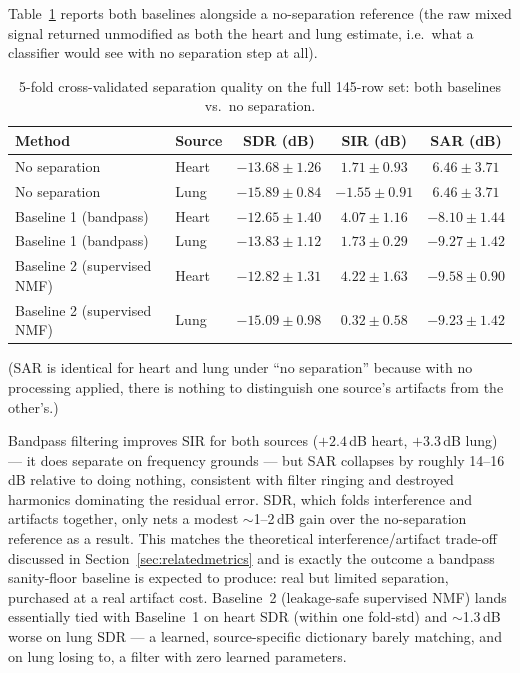 \documentclass[11pt]{article}
\begin{document}
Table~\ref{tab:baselinefull} reports both baselines alongside a
no-separation reference (the raw mixed signal returned unmodified as both
the heart and lung estimate, i.e.\ what a classifier would see with no
separation step at all).

\begin{table}[H]
\centering
\caption{5-fold cross-validated separation quality on the full 145-row set: both baselines vs.\ no separation.}
\label{tab:baselinefull}
\begin{tabular}{@{}llccc@{}}
\toprule
Method & Source & SDR (dB) & SIR (dB) & SAR (dB) \\
\midrule
No separation & Heart & $-13.68 \pm 1.26$ & $1.71 \pm 0.93$  & $6.46 \pm 3.71$ \\
No separation & Lung  & $-15.89 \pm 0.84$ & $-1.55 \pm 0.91$ & $6.46 \pm 3.71$ \\
\addlinespace
Baseline 1 (bandpass) & Heart & $-12.65 \pm 1.40$ & $4.07 \pm 1.16$  & $-8.10 \pm 1.44$ \\
Baseline 1 (bandpass) & Lung  & $-13.83 \pm 1.12$ & $1.73 \pm 0.29$  & $-9.27 \pm 1.42$ \\
\addlinespace
Baseline 2 (supervised NMF) & Heart & $-12.82 \pm 1.31$ & $4.22 \pm 1.63$  & $-9.58 \pm 0.90$ \\
Baseline 2 (supervised NMF) & Lung  & $-15.09 \pm 0.98$ & $0.32 \pm 0.58$  & $-9.23 \pm 1.42$ \\
\bottomrule
\end{tabular}
\end{table}

\noindent (SAR is identical for heart and lung under ``no separation''
because with no processing applied, there is nothing to distinguish one
source's artifacts from the other's.)

Bandpass filtering improves SIR for both sources ($+2.4$\,dB heart,
$+3.3$\,dB lung) --- it does separate on frequency grounds --- but SAR
collapses by roughly 14--16\,dB relative to doing nothing, consistent with
filter ringing and destroyed harmonics dominating the residual error. SDR,
which folds interference and artifacts together, only nets a modest
$\sim$1--2\,dB gain over the no-separation reference as a result. This
matches the theoretical interference/artifact trade-off discussed in
Section~\ref{sec:relatedmetrics} and is exactly the outcome a bandpass
sanity-floor baseline is expected to produce: real but limited separation,
purchased at a real artifact cost. Baseline~2 (leakage-safe supervised NMF)
lands essentially tied with Baseline~1 on heart SDR (within one fold-std)
and $\sim$1.3\,dB worse on lung SDR --- a learned, source-specific
dictionary barely matching, and on lung losing to, a filter with zero
learned parameters.
\end{document}
